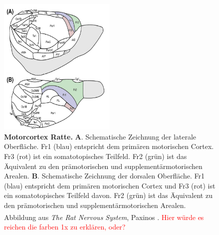 \documentclass[12pt,a4paper,pdftex]{article}
\begin{document}
\begin{figure}[H]
    \centering
    \includegraphics[width=0.5\textwidth]{pictures/Bilder_Laura/rat_motorcortex_1.png}
    \caption[Motorcortex Ratte]{\textbf{Motorcortex Ratte.} \textbf{A}. Schematische Zeichnung der laterale Oberfläche. Fr1 (blau) entspricht dem primären motorischen Cortex. Fr3 (rot) ist ein somatotopisches Teilfeld. Fr2 (grün) ist das Äquivalent zu den prämotorischen und supplementärmotorischen Arealen. \textbf{B}. Schematische Zeichnung der dorsalen Oberfläche. Fr1 (blau) entspricht dem primären motorischen Cortex und Fr3 (rot) ist ein somatotopisches Teilfeld davon. Fr2 (grün) ist das Äquivalent zu den prämotorischen und supplementärmotorischen Arealen. Abbildung aus \textit{The Rat Nervous System}, Paxinos \textsuperscript{\cite[22]{paxinos2014rat}}. \textcolor{red}{Hier würde es reichen die farben 1x zu erklären, oder?}}
    \label{fig:motorcortex_ratte}
\end{figure}
\end{document}
